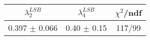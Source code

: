 \begin{tabular}{c|c||c}
$\lambda_{2}^{LSB}$ & $\lambda_4^{LSB}$ & $\chi^{2}$/ndf \\
\hline
0.397 $\pm$ 0.066 & 0.40 $\pm$ 0.15 & 117/99\\
\end{tabular}
